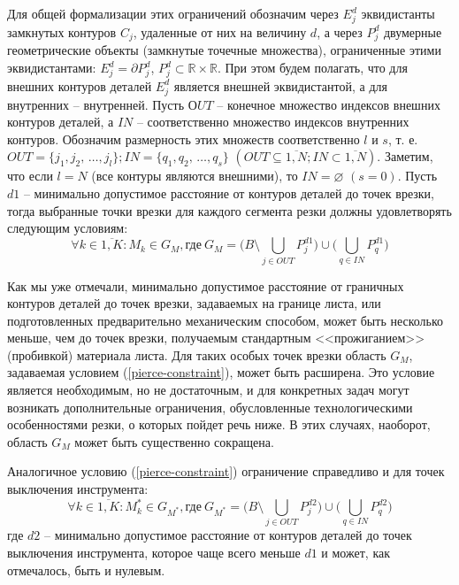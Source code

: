 \documentclass[11pt,twoside,openany]{report}
\begin{document}
Для общей формализации этих ограничений обозначим через
$E_j^d$ эквидистанты замкнутых контуров $C_j$,
удаленные от них на величину $d$,
а через
$P_j^d$ двумерные геометрические объекты
(замкнутые точечные множества),
ограниченные этими эквидистантами:
$E_j^d = \partial P_j^d$,
$P_j^d \subset \mathbb R \times \mathbb R$.
При этом будем полагать,
что для внешних контуров деталей
$E_j^d$
является внешней эквидистантой,
а для внутренних -- внутренней.
Пусть $ОUT$ -- конечное множество индексов внешних контуров деталей,
а $IN$ -- соответственно множество индексов внутренних контуров.
Обозначим  размерность этих множеств соответственно $l$ и $s$,
т. е.
$OUT = \{j_1, j_2, \,\dots, j_l\};
IN = \{q_1, q_2, \,\dots, q_s\}$
$(OUT \subseteq \overline{1,N};
IN \subset \overline{1,N})$.
Заметим, что если $l=N$
(все контуры являются внешними), то
$IN = \varnothing$
$(s = 0)$.
Пусть $d1$ -- минимально допустимое расстояние от контуров деталей до точек врезки,
тогда выбранные точки врезки для каждого сегмента резки должны удовлетворять следующим условиям:
\begin{equation}
  \forall k \in \overline{1,K}:
  M_k \in G_M,
  \text{где}\:
  G_M = \big(B \setminus \bigcup_{j\in OUT} P_j^{d1} \big)
  \cup
  \big( \bigcup_{q\in IN}P_q^{d1} \big)
  \label{pierce-constraint}
\end{equation}

Как мы уже отмечали,
минимально допустимое расстояние от граничных контуров деталей
до точек врезки,
задаваемых на границе листа,
или подготовленных предварительно механическим способом,
может быть несколько меньше,
чем до точек врезки, получаемым стандартным <<прожиганием>> (пробивкой) материала листа.
Для таких особых точек врезки область $G_M$,
задаваемая условием (\ref{pierce-constraint}),
может быть расширена.
Это условие является необходимым, но не достаточным,
и для конкретных задач могут возникать дополнительные ограничения,
обусловленные технологическими особенностями резки,
о которых пойдет речь ниже.
В этих случаях, наоборот, область $G_M$
может быть существенно сокращена.

Аналогичное условию (\ref{pierce-constraint})
ограничение справедливо и для точек выключения инструмента:
\begin{equation}
  \forall k \in \overline{1,K}:
  M_k^* \in G_{M^*},
  \text{где}\:
  G_{M^*} = \big(B \setminus \bigcup_{j\in OUT} P_j^{d2} \big)
	\cup
  \big( \bigcup_{q\in IN}P_q^{d2} \big)
  \label{tool-off-constraint}
\end{equation}
где $d2$ -- минимально допустимое расстояние
от контуров деталей до точек выключения инструмента,
которое чаще всего меньше $d1$
и может, как отмечалось, быть и нулевым.
\end{document}
